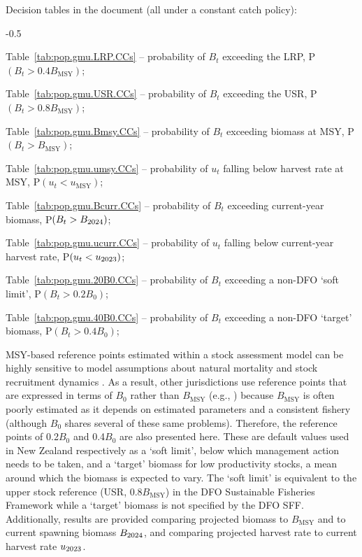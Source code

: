\documentclass[11pt]{book}
\newcommand{\Bmsy}{B_\text{MSY}}
\newcommand{\umsy}{u_\text{MSY}}
\begin{document}
Decision tables in the document (all under a constant catch policy):
\begin{itemize_csas}{-0.5}{}
\item Table~\ref{tab:pop.gmu.LRP.CCs} -- probability of $B_t$ exceeding the LRP, P$(B_t > 0.4 \Bmsy)$; %
\item Table~\ref{tab:pop.gmu.USR.CCs} -- probability of $B_t$ exceeding the USR, P$(B_t > 0.8 \Bmsy)$; %
\item Table~\ref{tab:pop.gmu.Bmsy.CCs} -- probability of $B_t$ exceeding biomass at MSY, P$(B_t > \Bmsy)$; %
\item Table~\ref{tab:pop.gmu.umsy.CCs} -- probability of $u_t$ falling below harvest rate at MSY, P$(u_t < \umsy)$; %
\item Table~\ref{tab:pop.gmu.Bcurr.CCs} -- probability of $B_t$ exceeding current-year biomass, P$(B_t > B_{2024})$; %
\item Table~\ref{tab:pop.gmu.ucurr.CCs} -- probability of $u_t$ falling below current-year harvest rate, P$(u_t < u_{2023})$; %
\item Table~\ref{tab:pop.gmu.20B0.CCs} -- probability of $B_t$ exceeding a non-DFO `soft limit', P$(B_t > 0.2 B_0)$; %
\item Table~\ref{tab:pop.gmu.40B0.CCs} -- probability of $B_t$ exceeding a non-DFO `target' biomass, P$(B_t > 0.4 B_0)$; %
\end{itemize_csas}

MSY-based reference points estimated within a stock assessment model can be highly sensitive to model assumptions about natural mortality and stock recruitment dynamics \citep{Forrest-etal:2018}.
As a result, other jurisdictions use reference points that are expressed in terms of $B_0$ rather than $\Bmsy$ (e.g., \citealt{NZMF:2011}) because $\Bmsy$ is often poorly estimated as it depends on estimated parameters and a consistent fishery (although $B_0$ shares several of these same problems).
Therefore, the reference points of 0.2$B_0$ and 0.4$B_0$ are also presented here.
These are default values used in New Zealand respectively as a `soft limit', below which management action needs to be taken, and a `target' biomass for low productivity stocks, a mean around which the biomass is expected to vary.
The `soft limit' is equivalent to the upper stock reference (USR, 0.8$\Bmsy$) in the DFO Sustainable Fisheries Framework while a `target' biomass is not specified by the DFO SFF.
Additionally, results are provided comparing projected biomass to $\Bmsy$ and to current spawning biomass $B_{2024}$, and comparing projected harvest rate to current harvest rate $u_{2023}$.
\end{document}
